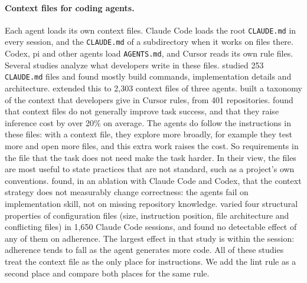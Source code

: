 \documentclass[pdflatex,sn-basic]{sn-jnl}
\newcommand{\file}[1]{\texttt{#1}}
\begin{document}
\paragraph{Context files for coding agents.}
Each agent loads its own context files.
Claude Code loads the root \file{CLAUDE.md} in every session, and the \file{CLAUDE.md} of a subdirectory when it works on files there.
Codex, pi and other agents load \file{AGENTS.md}, and Cursor reads its own rule files.
Several studies analyze what developers write in these files.
\citet{chatlatanagulchai2025manifests} studied 253 \file{CLAUDE.md} files and found mostly build commands, implementation details and architecture.
\citet{chatlatanagulchai2025agentreadmes} extended this to 2,303 context files of three agents.
\citet{jiang2026cursorrules} built a taxonomy of the context that developers give in Cursor rules, from 401 repositories.
\citet{gloaguen2026agentsmd} found that context files do not generally improve task success, and that they raise inference cost by over 20\% on average.
The agents do follow the instructions in these files: with a context file, they explore more broadly, for example they test more and open more files, and this extra work raises the cost.
So requirements in the file that the task does not need make the task harder.
In their view, the files are most useful to state practices that are not standard, such as a project's own conventions.
\citet{khatri2026contextfiles} found, in an ablation with Claude Code and Codex, that the context strategy does not measurably change correctness: the agents fail on implementation skill, not on missing repository knowledge.
\citet{mcmillan2026adherence} varied four structural properties of configuration files (size, instruction position, file architecture and conflicting files) in 1,650 Claude Code sessions, and found no detectable effect of any of them on adherence.
The largest effect in that study is within the session: adherence tends to fall as the agent generates more code.
All of these studies treat the context file as the only place for instructions.
We add the lint rule as a second place and compare both places for the same rule.
\end{document}

